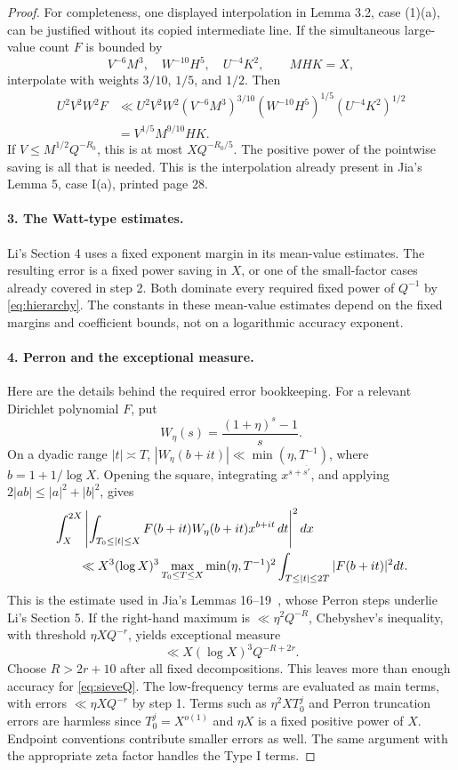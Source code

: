 \begin{proof}
For completeness, one displayed interpolation in Lemma 3.2,
case (1)(a), can be justified without its copied intermediate line.
If the simultaneous large-value count $F$ is bounded by
\[
 V^{-6}M^3,\quad W^{-10}H^5,\quad U^{-4}K^2,
 \qquad MHK=X,
\]
interpolate with weights $3/10$, $1/5$, and $1/2$. Then
\begin{align*}
 U^2V^2W^2F
 &\ll U^2V^2W^2
     (V^{-6}M^3)^{3/10}
     (W^{-10}H^5)^{1/5}(U^{-4}K^2)^{1/2}\\
 &=V^{1/5}M^{9/10}HK.
\end{align*}
If $V\le M^{1/2}Q^{-R_0}$, this is at most
$XQ^{-R_0/5}$. The positive power of the pointwise saving is all that
is needed. This is the interpolation already present in Jia's
Lemma 5, case I(a), printed page 28.

\paragraph{3. The Watt-type estimates.}
Li's Section 4 uses a fixed exponent margin in its mean-value
estimates. The resulting error is a fixed power saving in $X$,
or one of the small-factor cases already covered in step 2.
Both dominate every required fixed power of $Q^{-1}$ by
\eqref{eq:hierarchy}. The constants in these mean-value estimates
depend on the fixed margins and coefficient bounds, not on a
logarithmic accuracy exponent.

\paragraph{4. Perron and the exceptional measure.}
Here are the details behind the required error bookkeeping.
For a relevant Dirichlet polynomial $F$, put
\[
                W_\eta(s)=\frac{(1+\eta)^s-1}{s}.
\]
On a dyadic range $|t|\asymp T$,
$|W_\eta(b+it)|\ll\min(\eta,T^{-1})$, where $b=1+1/\log X$.
Opening the square, integrating $x^{s+\overline{s'}}$, and applying
$2|ab|\le |a|^2+|b|^2$, gives
\begin{align}
 &\int_X^{2X}\left|
     \int_{T_0\le |t|\le X}F(b+it)W_\eta(b+it)x^{b+it}\,dt
                       \right|^2dx \nonumber\\
 &\hspace{7mm}\ll X^3(\log X)^3
       \max_{T_0\le T\le X}
       \min(\eta,T^{-1})^2
          \int_{T\le |t|\le2T}|F(b+it)|^2dt. \label{eq:perronL2}
\end{align}
This is the estimate used in Jia's Lemmas 16--19~\cite{Jia}, whose
Perron steps underlie Li's Section 5.
If the right-hand maximum is $\ll\eta^2Q^{-R}$, Chebyshev's inequality,
with threshold $\eta XQ^{-r}$, yields exceptional measure
\[
                       \ll X(\log X)^3Q^{-R+2r}.
\]
Choose $R>2r+10$ after all fixed decompositions. This leaves more
than enough accuracy for \eqref{eq:sieveQ}.
The low-frequency terms are evaluated as main terms, with errors
$\ll\eta XQ^{-r}$ by step 1.
Terms such as $\eta^2XT_0^j$ and Perron truncation errors are harmless
since $T_0^j=X^{o(1)}$ and $\eta X$ is a fixed positive power of $X$.
Endpoint conventions contribute smaller errors as well.
The same argument with the appropriate zeta factor handles the
Type I terms.


\end{proof}
